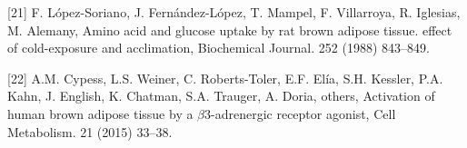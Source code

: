 \documentclass[]{elsarticle} %
\begin{document}
\hypertarget{ref-lopez1988amino}{}
{[}21{]} F. López-Soriano, J. Fernández-López, T. Mampel, F. Villarroya,
R. Iglesias, M. Alemany, Amino acid and glucose uptake by rat brown
adipose tissue. effect of cold-exposure and acclimation, Biochemical
Journal. 252 (1988) 843--849.

\hypertarget{ref-cypess2015activation}{}
{[}22{]} A.M. Cypess, L.S. Weiner, C. Roberts-Toler, E.F. Elía, S.H.
Kessler, P.A. Kahn, J. English, K. Chatman, S.A. Trauger, A. Doria,
others, Activation of human brown adipose tissue by a
\(\beta\)3-adrenergic receptor agonist, Cell Metabolism. 21 (2015)
33--38.
\end{document}
